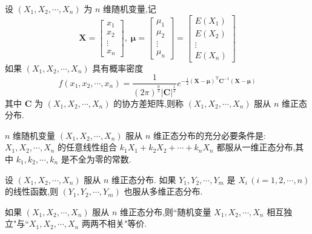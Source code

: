 设 $(X_1,X_2,\cdots,X_n)$ 为 $n$ 维随机变量,记
$$
\boldsymbol{X} = \begin{bmatrix}
    x_1 \\
    x_2 \\
    \vdots \\
    x_n
\end{bmatrix}, \;
\boldsymbol{\mu} = \begin{bmatrix}
    \mu_1 \\
    \mu_2 \\
    \vdots \\
    \mu_n
\end{bmatrix} = \begin{bmatrix}
    E(X_1) \\
    E(X_2) \\
    \vdots \\
    E(X_n)
\end{bmatrix}
$$
如果 $(X_1,X_2,\cdots,X_n)$ 具有概率密度
$$
f(x_1,x_2,\cdots,x_n) = \dfrac{1}{(2\pi)^{\frac{n}{2}} |\boldsymbol{C}|^{\frac{1}{2}}} e^{-\frac{1}{2} (\boldsymbol{X} - \boldsymbol{\mu})^{\text{T}} \boldsymbol{C}^{-1} (\boldsymbol{X} - \boldsymbol{\mu})}
$$
其中 $\boldsymbol{C}$ 为 $(X_1,X_2,\cdots,X_n)$ 的协方差矩阵,则称 $(X_1,X_2,\cdots,X_n)$ 服从 $n$ 维正态分布.

\begin{property}
    $n$ 维随机变量 $(X_1,X_2,\cdots,X_n)$ 服从 $n$ 维正态分布的充分必要条件是:\\
    $X_1,X_2,\cdots,X_n$ 的任意线性组合 $k_1 X_1 + k_2 X_2 + \cdots + k_n X_n$ 都服从一维正态分布,其中 $k_1,k_2,\cdots,k_n$ 是不全为零的常数.
\end{property}

\begin{property}
    设 $(X_1,X_2,\cdots,X_n)$ 服从 $n$ 维正态分布. 如果 $Y_1,Y_2,\cdots,Y_m$ 是 $X_i \, (i=1,2,\cdots,n)$ 的线性函数,则 $(Y_1,Y_2,\cdots,Y_m)$ 也服从多维正态分布.
\end{property}

\begin{property}
    如果 $(X_1,X_2,\cdots,X_n)$ 服从 $n$ 维正态分布,则``随机变量 $X_1,X_2,\cdots,X_n$ 相互独立"与``$X_1,X_2,\cdots,X_n$ 两两不相关"等价.
\end{property}